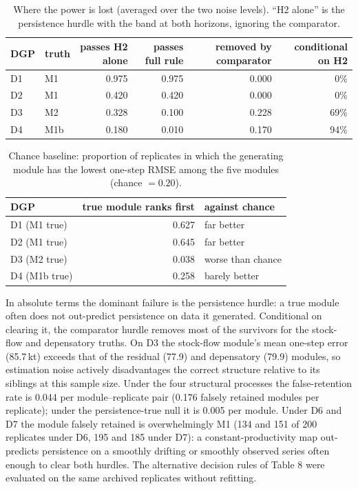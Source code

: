 \documentclass[preprint,11pt,authoryear]{elsarticle}
\theoremstyle{remark}
\begin{document}
\begin{table}[!htb]
\centering\small
\caption{Where the power is lost (averaged over the two noise levels). ``H2 alone'' is the persistence hurdle with the band at both horizons, ignoring the comparator.}
\label{tab:si_power}
\begin{tabular}{@{}llrrrr@{}}
\toprule
DGP & truth & passes H2 alone & passes full rule & removed by comparator & conditional on H2 \\
\midrule
D1 & M1 & 0.975 & 0.975 & 0.000 & 0\% \\
D2 & M1 & 0.420 & 0.420 & 0.000 & 0\% \\
D3 & M2 & 0.328 & 0.100 & 0.228 & 69\% \\
D4 & M1b & 0.180 & 0.010 & 0.170 & 94\% \\
\bottomrule
\end{tabular}
\end{table}

\begin{table}[!htb]
\centering\small
\caption{Chance baseline: proportion of replicates in which the generating module has the lowest one-step RMSE among the five modules (chance $=0.20$).}
\label{tab:si_chance}
\begin{tabular}{@{}lrl@{}}
\toprule
DGP & true module ranks first & against chance \\
\midrule
D1 (M1 true) & 0.627 & far better \\
D2 (M1 true) & 0.645 & far better \\
D3 (M2 true) & 0.038 & worse than chance \\
D4 (M1b true) & 0.258 & barely better \\
\bottomrule
\end{tabular}
\end{table}

In absolute terms the dominant failure is the persistence hurdle: a true module often does not out-predict persistence on data it generated. Conditional on clearing it, the comparator hurdle removes most of the survivors for the stock-flow and depensatory truths. On D3 the stock-flow module's mean one-step error (85.7\,kt) exceeds that of the residual (77.9) and depensatory (79.9) modules, so estimation noise actively disadvantages the correct structure relative to its siblings at this sample size. Under the four structural processes the false-retention rate is 0.044 per module--replicate pair (0.176 falsely retained modules per replicate); under the persistence-true null it is 0.005 per module. Under D6 and D7 the module falsely retained is overwhelmingly M1 (134 and 151 of 200 replicates under D6, 195 and 185 under D7): a constant-productivity map out-predicts persistence on a smoothly drifting or smoothly observed series often enough to clear both hurdles. The alternative decision rules of Table 8 were evaluated on the same archived replicates without refitting.
\end{document}
